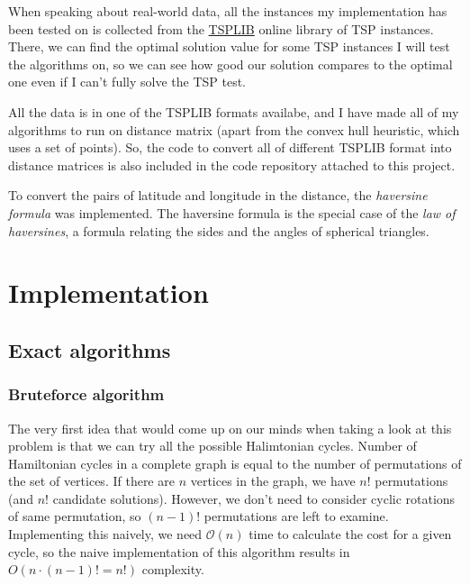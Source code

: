 \documentclass[12pt,twoside,notitlepage]{report}
\begin{document}
When speaking about real-world data, all the instances my implementation has been tested on is collected from the \hyperref[http://elib.zib.de/pub/mp-testdata/tsp/tsplib/tsplib.html]{TSPLIB} online library of TSP instances. There, we can find the optimal solution value for some TSP instances 
I will test the algorithms on, so we can see how good our solution compares to the optimal one even if I can't fully solve the TSP test.

All the data is in one of the TSPLIB formats availabe, and I have made all of my algorithms to run on distance matrix (apart from the convex hull heuristic, which uses a set of points). So, the code to convert all of different TSPLIB format into distance matrices is also included in the code repository attached to this project. 

To convert the pairs of latitude and longitude in the distance, the {\it haversine formula} was implemented. The haversine formula is the special case of the {\it law of haversines}, a formula relating the sides and the angles of spherical triangles.

\cleardoublepage
\chapter{Implementation}



\section{Exact algorithms}

\subsection{Bruteforce algorithm}

The very first idea that would come up on our minds when taking a look at this problem is that we can try all the possible Halimtonian cycles. Number of Hamiltonian cycles in a complete graph is equal to the number of permutations of the set of vertices. If there are $n$ vertices in the graph, we have $n!$ permutations (and $n!$ candidate solutions). However, we don't need to consider cyclic rotations of same permutation, so $(n - 1)!$ permutations are left to examine. Implementing this naively, we need $ \mathcal{O}(n) $ time to calculate the cost for a given cycle, so the naive implementation of this algorithm results in $ O(n \cdot (n - 1)! = n!) $ complexity.
\end{document}
